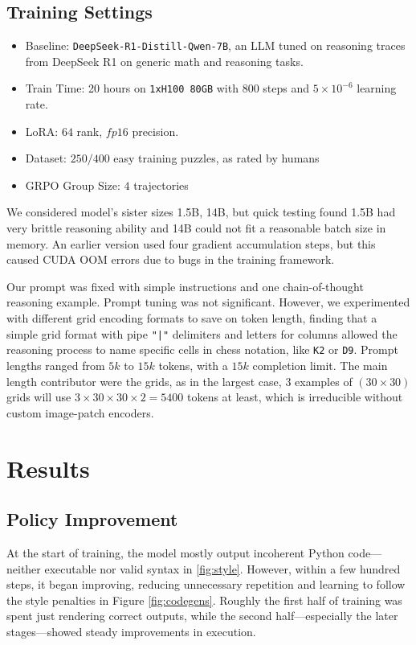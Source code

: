 \documentclass{article}
\begin{document}
\subsection{Training Settings}

\begin{itemize}
  \itemsep-.2em
  \item {Baseline}: \texttt{DeepSeek-R1-Distill-Qwen-7B}, an LLM tuned on reasoning traces from DeepSeek R1 on generic math and reasoning tasks.
  \item Train Time: 20 hours on \texttt{1xH100 80GB} with $800$ steps and $5\times10^{-6}$ learning rate.
  \item LoRA: $64$ rank, $fp16$ precision.
  \item Dataset: $250/400$ easy training puzzles, as rated by humans \cite{harc}
  \item GRPO Group Size: $4$ trajectories
\end{itemize}
We considered model's sister sizes 1.5B, 14B, but quick testing found 1.5B had very brittle reasoning ability and 14B could not fit a reasonable batch size in memory. An earlier version used four gradient accumulation steps, but this caused CUDA OOM errors due to bugs in the training framework.

Our prompt was fixed with simple instructions and one chain-of-thought reasoning example. Prompt tuning was not significant. However, we experimented with different grid encoding formats to save on token length, finding that a simple grid format with pipe \texttt{"|"} delimiters and letters for columns allowed the reasoning process to name specific cells in chess notation, like \texttt{K2} or \texttt{D9}. Prompt lengths ranged from $5k$ to $15k$ tokens, with a $15k$ completion limit. The main length contributor were the grids, as in the largest case, $3$ examples of $(30 \times 30)$ grids will use $3 \times 30 \times 30 \times 2 = 5400$ tokens at least, which is irreducible without custom image-patch encoders.
\section{Results}

\subsection{Policy Improvement}

At the start of training, the model mostly output incoherent Python code—neither executable nor valid syntax in \ref{fig:style}. However, within a few hundred steps, it began improving, reducing unnecessary repetition and learning to follow the style penalties in Figure \ref{fig:codegens}. Roughly the first half of training was spent just rendering correct outputs, while the second half—especially the later stages—showed steady improvements in execution.
\end{document}
